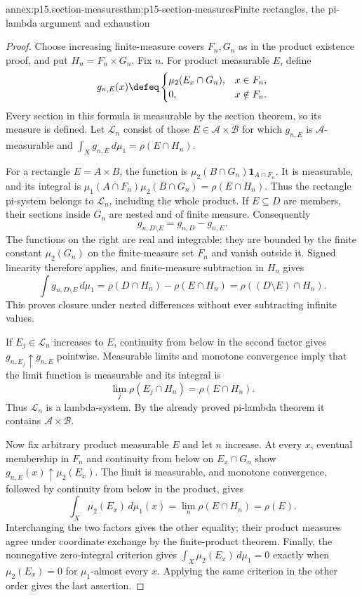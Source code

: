 \begin{annexitem}{annex:p15.section-measures}{thm:p15-section-measures}{Finite rectangles, the pi-lambda argument and exhaustion}
\begin{proof}
Choose increasing finite-measure covers \(F_n,G_n\) as in the product
existence proof, and put \(H_n=F_n\times G_n\). Fix \(n\).
For product measurable \(E\), define
\[
 g_{n,E}(x)\defeq
 \begin{cases}
  \mu_2(E_x\cap G_n),&x\in F_n,\\
  0,&x\notin F_n.
 \end{cases}
\]
Every section in this formula is measurable by the section theorem,
so its measure is defined. Let \(\mathcal L_n\) consist of those
\(E\in\mathcal A\times\mathcal B\) for which \(g_{n,E}\)
is \(\mathcal A\)-measurable and
\(\int_X g_{n,E}\,d\mu_1=\rho(E\cap H_n)\).

For a rectangle \(E=A\times B\), the function is
\(\mu_2(B\cap G_n)\mathbf1_{A\cap F_n}\). It is measurable,
and its integral is
\(\mu_1(A\cap F_n)\mu_2(B\cap G_n)=\rho(E\cap H_n)\).
Thus the rectangle pi-system belongs to \(\mathcal L_n\), including
the whole product. If \(E\subseteq D\) are members, their sections
inside \(G_n\) are nested and of finite measure. Consequently
\[
 g_{n,D\setminus E}=g_{n,D}-g_{n,E}.
\]
The functions on the right are real and integrable: they are bounded
by the finite constant \(\mu_2(G_n)\) on the finite-measure set
\(F_n\) and vanish outside it. Signed linearity therefore applies,
and finite-measure subtraction in \(H_n\) gives
\[
 \int g_{n,D\setminus E}\,d\mu_1
  =\rho(D\cap H_n)-\rho(E\cap H_n)
  =\rho((D\setminus E)\cap H_n).
\]
This proves closure under nested differences without ever subtracting
infinite values.

If \(E_j\in\mathcal L_n\) increases to \(E\), continuity from
below in the second factor gives \(g_{n,E_j}\uparrow g_{n,E}\)
pointwise. Measurable limits and monotone convergence imply that the
limit function is measurable and its integral is
\[
 \lim_j\rho(E_j\cap H_n)=\rho(E\cap H_n).
\]
Thus \(\mathcal L_n\) is a lambda-system. By the already proved
pi-lambda theorem it contains \(\mathcal A\times\mathcal B\).

Now fix arbitrary product measurable \(E\) and let \(n\) increase.
At every \(x\), eventual membership in \(F_n\) and continuity
from below on \(E_x\cap G_n\) show
\(g_{n,E}(x)\uparrow\mu_2(E_x)\). The limit is measurable, and
monotone convergence, followed by continuity from below in the product,
gives
\[
 \int_X\mu_2(E_x)\,d\mu_1(x)
   =\lim_n\rho(E\cap H_n)=\rho(E).
\]
Interchanging the two factors gives the other equality; their product
measures agree under coordinate exchange by the finite-product theorem.
Finally, the nonnegative zero-integral criterion gives
\(\int_X\mu_2(E_x)\,d\mu_1=0\) exactly when
\(\mu_2(E_x)=0\) for \(\mu_1\)-almost every \(x\).
Applying the same criterion in the other order gives the last assertion.
\end{proof}
\end{annexitem}

